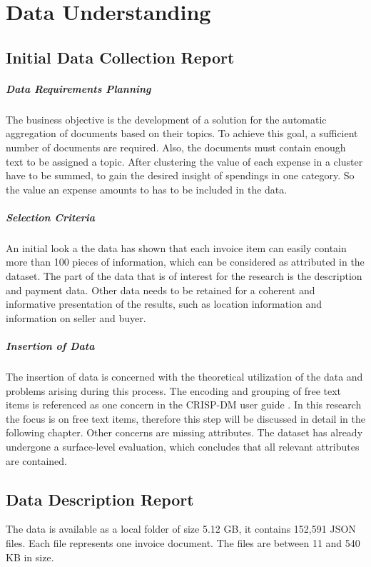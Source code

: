 \chapter{Data Understanding}

\section{Initial Data Collection Report}

\paragraph{Data Requirements Planning}
The business objective is the development of a solution for the automatic aggregation of documents based on their topics. To achieve this goal, a sufficient number of documents are required. Also, the documents must contain enough text to be assigned a topic. After clustering the value of each expense in a cluster have to be summed, to gain the desired insight of spendings in one category. So the value an expense amounts to has to be included in the data.

\paragraph{Selection Criteria}
An initial look a the data has shown that each invoice item can easily contain more than 100 pieces of information, which can be considered as attributed in the dataset. The part of the data that is of interest for the research is the description and payment data. Other data needs to be retained for a coherent and informative presentation of the results, such as location information and information on seller and buyer.

\paragraph{Insertion of Data}
The insertion of data is concerned with the theoretical utilization of the data and problems arising during this process. The encoding and grouping of free text items is referenced as one concern in the \ac{CRISP-DM} user guide \cite[p.~38]{CRISPDM2000}. In this research the focus is on free text items, therefore this step will be discussed in detail in the following chapter. 
Other concerns are missing attributes. The dataset has already undergone a surface-level evaluation, which concludes that all relevant attributes are contained.

\section{Data Description Report}
The data is available as a local folder of size 5.12 GB, it contains 152,591 \ac{JSON} files. Each file represents one invoice document. The files are between 11 and 540 KB in size.

